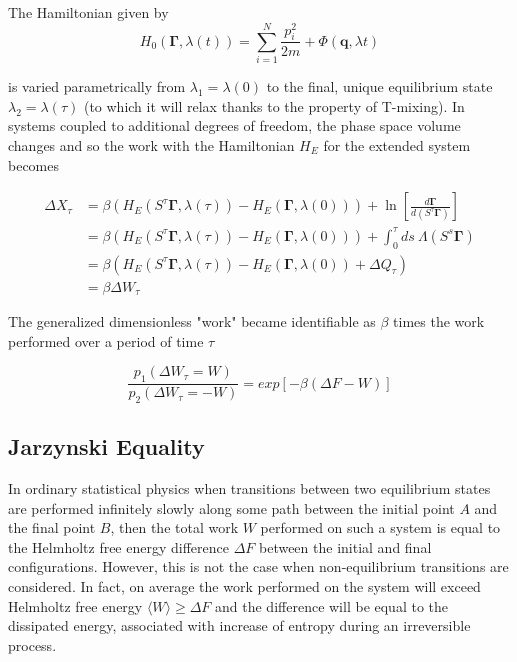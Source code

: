 \documentclass[a4paper,12pt]{article}
\begin{document}
The Hamiltonian given by
\begin{equation}
  H_0(\bm{\Gamma},\lambda(t)) = \sum_{i=1}^N \frac{p_i^2}{2m} + \Phi(\bm{q}, \lambda{t})
\end{equation}

is varied parametrically from $\lambda_1 =\lambda(0)$ to the final, unique equilibrium state $\lambda_2 = \lambda(\tau)$ (to which it will relax thanks to the property of T-mixing). In systems coupled to additional degrees of freedom, the phase space volume changes and so the work with the Hamiltonian $H_E$ for the extended system becomes

\begin{equation}
\begin{aligned}
  \Delta X_\tau &= \beta ( H_E(S^\tau \bm{\Gamma}, \lambda(\tau))-H_E(\bm{\Gamma},\lambda(0))) + \ln\left[\frac{d\bm{\Gamma}}{d(S^\tau \bm{\Gamma})}\right]\\
  &=\beta ( H_E(S^\tau \bm{\Gamma}, \lambda(\tau))-H_E(\bm{\Gamma},\lambda(0))) + \int_0^\tau ds\ \Lambda(S^s\bm{\Gamma})\\
  &=\beta ( H_E(S^\tau \bm{\Gamma}, \lambda(\tau))-H_E(\bm{\Gamma},\lambda(0)) +\Delta Q_\tau) \\
  &=\beta \Delta W_\tau
\end{aligned}
\end{equation}

The generalized dimensionless "work" became identifiable as $\beta$ times the work performed over a period of time $\tau$

\begin{equation}
\label{CFT}
  \frac{p_1(\Delta W_\tau =W)}{p_2(\Delta W_\tau = -W)} = exp[-\beta (\Delta F - W)]
\end{equation}


\subsection{Jarzynski Equality}

In ordinary statistical physics when transitions between two equilibrium states are performed infinitely slowly along some path between the initial point $A$ and the final point $B$, then the total work $W$ performed on such a system is equal to the Helmholtz free energy difference $\Delta F$ between the initial and final configurations. However, this is not the case when non-equilibrium transitions are considered. In fact, on average the work performed on the system will exceed Helmholtz free energy $ \langle  W \rangle \geq \Delta F $ and the difference will be equal to the dissipated energy, associated with increase of entropy during an irreversible process.
\end{document}
